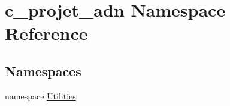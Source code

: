 \hypertarget{namespacec__projet__adn}{}\section{c\+\_\+projet\+\_\+adn Namespace Reference}
\label{namespacec__projet__adn}
\subsection*{Namespaces}
\begin{DoxyCompactItemize}
\item 
namespace \hyperlink{namespacec__projet__adn_1_1_utilities}{Utilities}
\end{DoxyCompactItemize}
